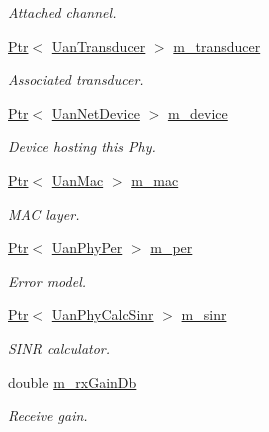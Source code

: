 \begin{DoxyCompactItemize}
\begin{DoxyCompactList}\small\item\em Attached channel. \end{DoxyCompactList}\item 
\hyperlink{classns3_1_1Ptr}{Ptr}$<$ \hyperlink{classns3_1_1UanTransducer}{Uan\+Transducer} $>$ \hyperlink{classns3_1_1UanPhyGen_a6d59c0cbdf61b841cbfc3f6737f7436f}{m\+\_\+transducer}
\begin{DoxyCompactList}\small\item\em Associated transducer. \end{DoxyCompactList}\item 
\hyperlink{classns3_1_1Ptr}{Ptr}$<$ \hyperlink{classns3_1_1UanNetDevice}{Uan\+Net\+Device} $>$ \hyperlink{classns3_1_1UanPhyGen_ad460ee08b16ac63f5067b8b521866cbe}{m\+\_\+device}
\begin{DoxyCompactList}\small\item\em Device hosting this Phy. \end{DoxyCompactList}\item 
\hyperlink{classns3_1_1Ptr}{Ptr}$<$ \hyperlink{classns3_1_1UanMac}{Uan\+Mac} $>$ \hyperlink{classns3_1_1UanPhyGen_a81c4906ead124f86017c0e7597d13c83}{m\+\_\+mac}
\begin{DoxyCompactList}\small\item\em M\+AC layer. \end{DoxyCompactList}\item 
\hyperlink{classns3_1_1Ptr}{Ptr}$<$ \hyperlink{classns3_1_1UanPhyPer}{Uan\+Phy\+Per} $>$ \hyperlink{classns3_1_1UanPhyGen_a14a4a149970cb2d9f0041a52e7934896}{m\+\_\+per}
\begin{DoxyCompactList}\small\item\em Error model. \end{DoxyCompactList}\item 
\hyperlink{classns3_1_1Ptr}{Ptr}$<$ \hyperlink{classns3_1_1UanPhyCalcSinr}{Uan\+Phy\+Calc\+Sinr} $>$ \hyperlink{classns3_1_1UanPhyGen_a52607020671ae668cb8b01d9ff6d7422}{m\+\_\+sinr}
\begin{DoxyCompactList}\small\item\em S\+I\+NR calculator. \end{DoxyCompactList}\item 
double \hyperlink{classns3_1_1UanPhyGen_ac90a5f64e1ac71bd0ea8b0a75e368dd0}{m\+\_\+rx\+Gain\+Db}
\begin{DoxyCompactList}\small\item\em Receive gain. \end{DoxyCompactList}\item 

\end{DoxyCompactItemize}

